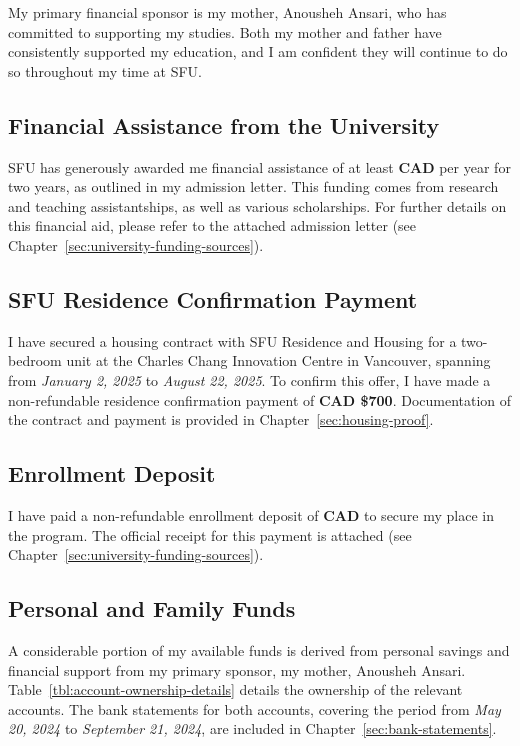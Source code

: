 \vspace{0.3cm}
My primary financial sponsor is my mother, Anousheh Ansari, who has committed to supporting my studies. Both my mother and father have consistently supported my education, and I am confident they will continue to do so throughout my time at SFU. 

\subsection{Financial Assistance from the University}\label{ssec:sfu-funding-info}
SFU has generously awarded me financial assistance of at least \textbf{CAD {\universityFunds}} per year for two years, as outlined in my admission letter. This funding comes from research and teaching assistantships, as well as various scholarships. For further details on this financial aid, please refer to the attached admission letter (see Chapter~\ref{sec:university-funding-sources}).

\subsection{SFU Residence Confirmation Payment}\label{ssec:residence-confirmation-payment}
I have secured a housing contract with SFU Residence and Housing for a two-bedroom unit at the Charles Chang Innovation Centre in Vancouver, spanning from \textit{January 2, 2025} to \textit{August 22, 2025}. To confirm this offer, I have made a non-refundable residence confirmation payment of \textbf{CAD \$700}. Documentation of the contract and payment is provided in Chapter~\ref{sec:housing-proof}.

\subsection{Enrollment Deposit}\label{ssec:enrollment-deposit}
I have paid a non-refundable enrollment deposit of \textbf{CAD {\enrollmentDeposit}} to secure my place in the program. The official receipt for this payment is attached (see Chapter~\ref{sec:university-funding-sources}).

\clearpage

\subsection{Personal and Family Funds}\label{ssec:personal-family-funds}
A considerable portion of my available funds is derived from personal savings and financial support from my primary sponsor, my mother, Anousheh Ansari. Table~\ref{tbl:account-ownership-details} details the ownership of the relevant accounts. The bank statements for both accounts, covering the period from \textit{May 20, 2024} to \textit{September 21, 2024}, are included in Chapter~\ref{sec:bank-statements}.

